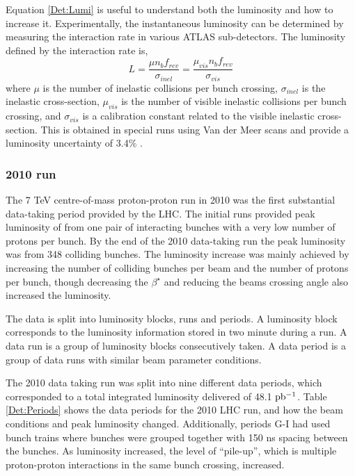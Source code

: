 Equation \ref{Det:Lumi} is useful to understand both the luminosity and how to increase it. 
Experimentally, the instantaneous luminosity can be determined by measuring the interaction rate in various ATLAS sub-detectors.
The luminosity defined by the interaction rate is,
\begin{equation}
L=\frac{\mu n_bf_{rev}}{\sigma_{inel}}=\frac{\mu_{vis}n_bf_{rev}}{\sigma_{vis}}
\label{Det:Lumi2}
\end{equation}
where $\mu$ is the number of inelastic collisions per bunch crossing, $\sigma_{inel}$ is the inelastic cross-section, $\mu_{vis}$ is the number of visible inelastic collisions per bunch crossing, and $\sigma_{vis}$ is a calibration constant related to the visible inelastic cross-section. 
This is obtained in special runs using Van der Meer scans and provide a luminosity uncertainty of 3.4\% \cite{ref:Lumi}.

\subsubsection{2010 run}
The 7 TeV centre-of-mass proton-proton run in 2010 was the first substantial data-taking period provided by the LHC. 
The initial runs provided peak luminosity of  from one pair of interacting bunches with a very low number of protons per bunch. 
By the end of the 2010 data-taking run the peak luminosity was  from 348 colliding bunches.
The luminosity increase was mainly achieved by increasing the number of colliding bunches per beam and the number of protons per bunch, though decreasing the $\beta^\star$ and reducing the beams crossing angle also increased the luminosity.

The data is split into luminosity blocks, runs and periods.
A luminosity block corresponds to the luminosity information stored in two minute during a run. 
A data run is a group of luminosity blocks consecutively taken. 
A data period is a group of data runs with similar beam parameter conditions.

The 2010 data taking run was split into nine different data periods, which corresponded to a total integrated luminosity delivered of 48.1 $\rm pb^{-1}$.
Table \ref{Det:Periods} shows the data periods for the 2010 LHC run, and how the beam conditions and peak luminosity changed.  
Additionally, periods G-I had used bunch trains where bunches were grouped together with 150 ns spacing between the bunches.  
As luminosity increased, the level of ``pile-up'', which is multiple proton-proton interactions in the same bunch crossing, increased.

